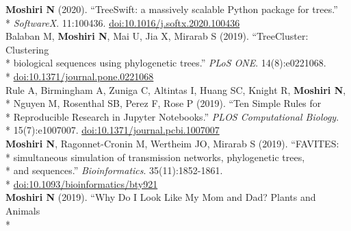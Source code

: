 \documentclass[margin,line]{res}
\begin{document}
\begin{resume}
\hspace*{4mm} \textbf{Moshiri N} (2020). ``TreeSwift: a massively scalable Python package for trees.''\\*\vspace{2mm}
\hspace*{8mm} \textit{SoftwareX}. 11:100436. \href{https://doi.org/10.1016/j.softx.2020.100436}{doi:10.1016/j.softx.2020.100436}\\
\hspace*{4mm} Balaban M, \textbf{Moshiri N}, Mai U, Jia X, Mirarab S (2019). ``TreeCluster: Clustering\\*
\hspace*{9mm} biological sequences using phylogenetic trees.'' \textit{PLoS ONE}. 14(8):e0221068.\\*\vspace{2mm}
\hspace*{8mm} \href{https://doi.org/10.1371/journal.pone.0221068}{doi:10.1371/journal.pone.0221068}\\
\hspace*{4mm} Rule A, Birmingham A, Zuniga C, Altintas I, Huang SC, Knight R, \textbf{Moshiri N},\\*
\hspace*{9mm} Nguyen M, Rosenthal SB, Perez F, Rose P (2019). ``Ten Simple Rules for\\*
\hspace*{9mm} Reproducible Research in Jupyter Notebooks.'' \textit{PLOS Computational Biology}.\\*\vspace{2mm}
\hspace*{8mm} 15(7):e1007007. \href{https://doi.org/10.1371/journal.pcbi.1007007}{doi:10.1371/journal.pcbi.1007007}\\
\hspace*{4mm} \textbf{Moshiri N}, Ragonnet-Cronin M, Wertheim JO, Mirarab S (2019). ``FAVITES:\\*
\hspace*{9mm} simultaneous simulation of transmission networks, phylogenetic trees,\\*
\hspace*{9mm} and sequences.'' \textit{Bioinformatics}. 35(11):1852-1861.\\*\vspace{2mm}
\hspace*{8mm} \href{https://doi.org/10.1093/bioinformatics/bty921}{doi:10.1093/bioinformatics/bty921}\\
\hspace*{4mm} \textbf{Moshiri N} (2019). ``Why Do I Look Like My Mom and Dad? Plants and Animals\\*

\end{resume}
\end{document}
